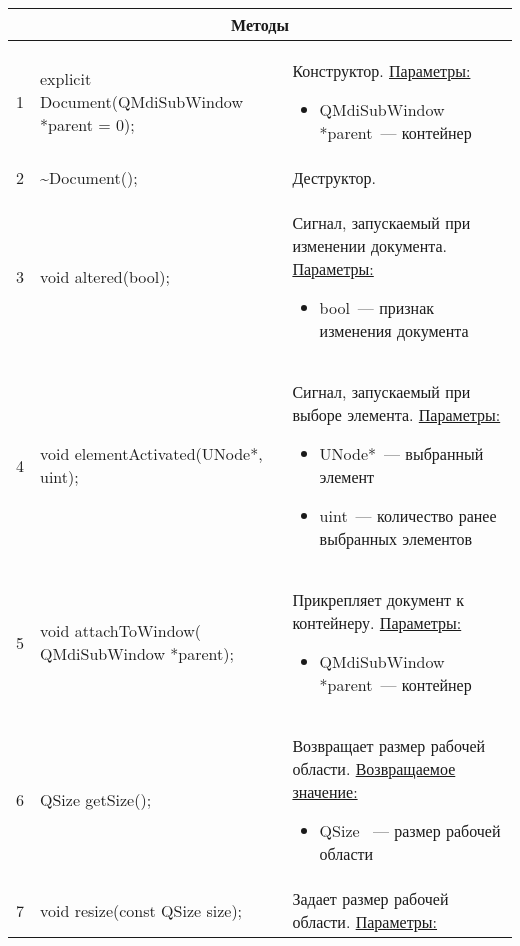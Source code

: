 \begin{longtable}[h]{|p{}|p{}|p{}|}
  \multicolumn{3}{|c|}{\textbf{Методы}} \\
  \hline
  1 & explicit Document(QMdiSubWindow *parent = 0); &
    Конструктор.\newline
    \uline{Параметры:}
    \begin{itemize}[nolistsep,label=,leftmargin=0cm]
      \item QMdiSubWindow *parent~--- контейнер
    \end{itemize}\\ \hline
  2 & \textasciitilde Document(); & Деструктор. \\ \hline
  3 & void altered(bool); & Сигнал, запускаемый при изменении документа.\newline
    \uline{Параметры:}
    \begin{itemize}[nolistsep,label=,leftmargin=0cm]
      \item bool~--- признак изменения документа
    \end{itemize}\\ \hline
  4 & void elementActivated(UNode*, uint); & Сигнал, запускаемый при выборе элемента.\newline
    \uline{Параметры:}
    \begin{itemize}[nolistsep,label=,leftmargin=0cm]
      \item UNode*~--- выбранный элемент
      \item uint~--- количество ранее выбранных элементов
    \end{itemize}\\ \hline
  5 & void  attachToWindow( QMdiSubWindow *parent); & Прикрепляет документ к контейнеру.\newline
    \uline{Параметры:}
    \begin{itemize}[nolistsep,label=,leftmargin=0cm]
      \item QMdiSubWindow *parent~--- контейнер
    \end{itemize}\\ \hline
  6 & QSize getSize(); & Возвращает размер рабочей области.\newline
    \uline{Возвращаемое значение:}
    \begin{itemize}[nolistsep,label=,leftmargin=0cm]
      \item QSize ~--- размер рабочей области
    \end{itemize}\\ \hline
  7 & void  resize(const QSize size); & Задает размер рабочей области.\newline
    \uline{Параметры:}

\end{longtable}

